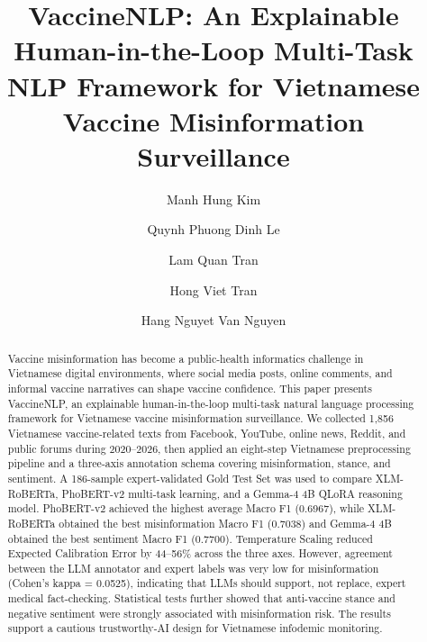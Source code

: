 \documentclass[runningheads]{llncs}
\begin{document}
\title{VaccineNLP: An Explainable Human-in-the-Loop Multi-Task NLP Framework for Vietnamese Vaccine Misinformation Surveillance}

\author{Manh Hung Kim \and Quynh Phuong Dinh Le \and Lam Quan Tran \and Hong Viet Tran \and Hang Nguyet Van Nguyen}

\maketitle
\vspace{-0.65cm}

\begin{abstract}
Vaccine misinformation has become a public-health informatics challenge in Vietnamese digital environments, where social media posts, online comments, and informal vaccine narratives can shape vaccine confidence. This paper presents VaccineNLP, an explainable human-in-the-loop multi-task natural language processing framework for Vietnamese vaccine misinformation surveillance. We collected 1,856 Vietnamese vaccine-related texts from Facebook, YouTube, online news, Reddit, and public forums during 2020--2026, then applied an eight-step Vietnamese preprocessing pipeline and a three-axis annotation schema covering misinformation, stance, and sentiment. A 186-sample expert-validated Gold Test Set was used to compare XLM-RoBERTa, PhoBERT-v2 multi-task learning, and a Gemma-4 4B QLoRA reasoning model. PhoBERT-v2 achieved the highest average Macro F1 (0.6967), while XLM-RoBERTa obtained the best misinformation Macro F1 (0.7038) and Gemma-4 4B obtained the best sentiment Macro F1 (0.7700). Temperature Scaling reduced Expected Calibration Error by 44--56\% across the three axes. However, agreement between the LLM annotator and expert labels was very low for misinformation (Cohen's kappa = 0.0525), indicating that LLMs should support, not replace, expert medical fact-checking. Statistical tests further showed that anti-vaccine stance and negative sentiment were strongly associated with misinformation risk. The results support a cautious trustworthy-AI design for Vietnamese infodemic monitoring.

\end{abstract}
\end{document}

